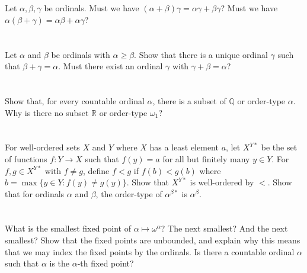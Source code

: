 \documentclass[12pt]{article}
\newenvironment{pbox}
    {\begin{lrbox}{\mybox}\begin{minipage}{0.98\textwidth}}
    {\end{minipage}\end{lrbox}\begin{center}\framebox[\textwidth]{\usebox{\mybox}}\end{center}}
\theoremstyle{definition}
\newcommand{\Q}{\mathbb{Q}}
\newcommand{\R}{\mathbb{R}}
\begin{document}
\newpage
\section{}
\begin{pbox}
    Let $\alpha, \beta, \gamma$ be ordinals. Must we have $(\alpha + \beta)\gamma = \alpha\gamma + \beta\gamma$? Must we have $\alpha(\beta + \gamma) = \alpha\beta + \alpha\gamma$?
\end{pbox}

\section{}
\begin{pbox}
    Let $\alpha$ and $\beta$ be ordinals with $\alpha \geq \beta$. Show that there is a unique ordinal $\gamma$ such that $\beta + \gamma = \alpha$. Must there exist an ordinal $\gamma$ with $\gamma + \beta = \alpha$?
\end{pbox}

\section{}
\begin{pbox}
    Show that, for every countable ordinal $\alpha$, there is a subset of $\Q$ or order-type $\alpha$. Why is there no subset $\R$ or order-type $\omega_1$?
\end{pbox}

\section{}
\begin{pbox}
    For well-ordered sets $X$ and $Y$ where $X$ has a least element $a$, let $X^{Y*}$ be the set of functions $f : Y \to X$ such that $f(y) = a$ for all but finitely many $y \in Y$. For $f, g \in X^{Y*}$ with $f \ne g$, define $f < g$ if $f(b) < g(b)$ where $b = \max\{y \in Y : f(y) \ne g(y)\}$. Show that $X^{Y*}$ is well-ordered by $<$. Show that for ordinals $\alpha$ and $\beta$, the order-type of $\alpha^{\beta*}$ is $\alpha^\beta$.
\end{pbox}

\section{}
\begin{pbox}
    What is the smallest fixed point of $\alpha \mapsto \omega^\alpha$? The next smallest? And the next smallest? Show that the fixed points are unbounded, and explain why this means that we may index the fixed points by the ordinals. Is there a countable ordinal $\alpha$ such that $\alpha$ is the $\alpha$-th fixed point?
\end{pbox}
\end{document}

